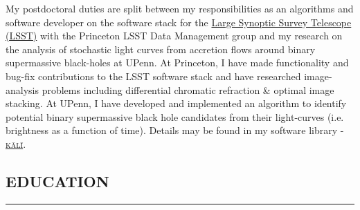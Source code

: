 \documentclass[10pt,a4]{article}
\begin{document}
My postdoctoral duties are split between my responsibilities as an algorithms and software developer on the software
stack for the \href{https://www.lsst.org/}{Large Synoptic Survey Telescope (LSST)} with the Princeton LSST Data Management
group and my research on the analysis of stochastic light curves from accretion flows around binary supermassive
black-holes at UPenn. At Princeton, I have made functionality and bug-fix contributions to the LSST software stack and have researched
image-analysis problems including differential chromatic refraction \& optimal image stacking. At UPenn, I have developed and
implemented an algorithm to identify potential binary supermassive black hole candidates from their light-curves (i.e. brightness
as a function of time). Details may be found in my software library - \href{https://github.com/AstroVPK/kali}{\textsc{k\={a}l\={i}}}.

\subsection*{EDUCATION}
\hrule  height 4pt
\vspace{0.2cm}
\end{document}

